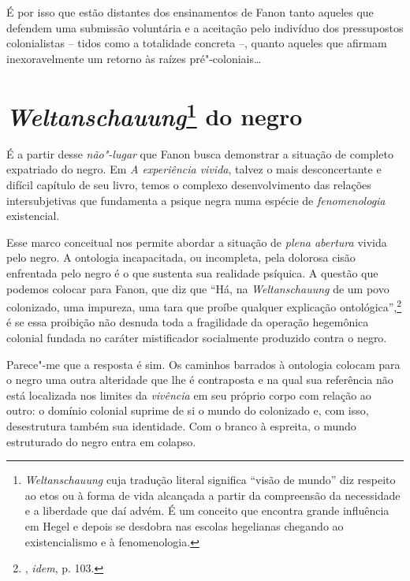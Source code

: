 É por isso que estão distantes dos ensinamentos de Fanon tanto aqueles
que defendem uma submissão voluntária e a aceitação pelo indivíduo dos
pressupostos colonialistas -- tidos como a totalidade concreta --, quanto aqueles que afirmam
inexoravelmente um retorno às raízes pré"-coloniais\ldots{}

\chapter{\emph{Weltanschauung}\footnote{\emph{Weltanschauung} cuja tradução literal significa ``visão de mundo'' diz respeito ao etos ou à forma de vida alcançada a partir da compreensão da necessidade e a liberdade que daí advém. É um conceito que encontra grande influência em Hegel e depois se desdobra nas escolas hegelianas chegando ao existencialismo e à fenomenologia.} do negro}

É a partir desse \emph{não"-lugar} que Fanon busca demonstrar a situação
de completo expatriado do negro. Em \emph{A experiência vivida}, talvez
o mais desconcertante e difícil capítulo de seu livro, temos o complexo
desenvolvimento das relações intersubjetivas que fundamenta a psique
negra numa espécie de \emph{fenomenologia} existencial.

Esse marco conceitual nos permite abordar a situação de \emph{plena
abertura} vivida pelo negro. A ontologia incapacitada, ou incompleta,
pela dolorosa cisão enfrentada pelo negro é o que sustenta sua realidade
psíquica. A questão que podemos
colocar para Fanon, que diz que ``Há, na \emph{Weltanschauung} de um
povo colonizado, uma impureza, uma tara que proíbe qualquer explicação
ontológica'',\footnote{, \emph{idem}, p. 103.} é se essa proibição não
desnuda toda a fragilidade da operação hegemônica colonial fundada no
caráter mistificador socialmente produzido contra o negro.

Parece"-me que a resposta é sim.
Os caminhos barrados à ontologia
colocam para o negro uma outra alteridade que lhe é contraposta e na
qual sua referência não está localizada nos limites da \emph{vivência}
em seu próprio corpo com relação ao outro: o domínio colonial suprime de
si o mundo do colonizado e, com isso, desestrutura também sua
identidade. Com o branco à espreita, o mundo estruturado do negro entra
em colapso.

